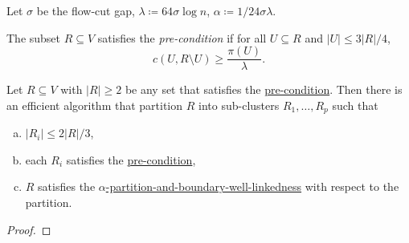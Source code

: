 \begin{notation}[Parameter]
	Let \(\sigma \) be the flow-cut gap, \(\lambda \coloneqq 64 \sigma \log n\), \(\alpha \coloneqq 1 / 24 \sigma \lambda \).
\end{notation}

\begin{definition}\label{def:pre-condition}
	The subset \(R \subseteq V\) satisfies the \emph{pre-condition} if for all \(U \subseteq R\) and \(\lvert U \rvert \leq 3 \lvert R \rvert / 4\),
	\[
		c(U, R \setminus U)
		\geq \frac{\pi (U)}{\lambda }.
	\]
\end{definition}

\begin{lemma}
	Let \(R \subseteq V\) with \(\lvert R \rvert \geq 2\)  be any set that satisfies the \hyperref[def:pre-condition]{pre-condition}. Then there is an efficient algorithm that partition \(R\) into sub-clusters \(R_1, \dots , R_p\) such that
	\begin{enumerate}[(a)]
		\item \(\lvert R_i \rvert \leq 2 \lvert R \rvert / 3\),
		\item each \(R_i\) satisfies the \hyperref[def:pre-condition]{pre-condition},
		\item \(R\) satisfies the \hyperref[def:partition-and-boundary-well-linked]{\(\alpha \)-partition-and-boundary-well-linkedness} with respect to the partition.
	\end{enumerate}
\end{lemma}
\begin{proof}

\end{proof}

